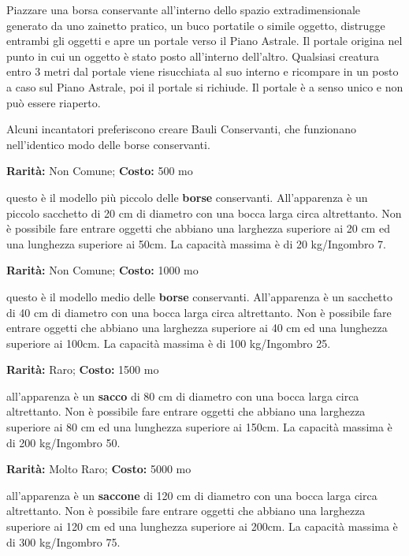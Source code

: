 \begin{multicols}{2}
Piazzare una borsa conservante all'interno dello spazio extradimensionale generato da uno zainetto pratico, un buco portatile o simile oggetto, distrugge entrambi gli oggetti e apre un portale verso il Piano Astrale. Il portale origina nel punto in cui un oggetto è stato posto all'interno dell'altro. Qualsiasi creatura entro 3 metri dal portale viene risucchiata al suo interno e ricompare in un posto a caso sul Piano Astrale, poi il portale si richiude. Il portale è a senso unico e non può essere riaperto.

Alcuni incantatori preferiscono creare Bauli Conservanti, che funzionano nell'identico modo delle borse conservanti.


\textbf{Rarità:} Non Comune; \textbf{Costo:} 500 mo

questo è il modello più piccolo delle \textbf{borse} conservanti. All'apparenza è un piccolo sacchetto di 20 cm di diametro con una bocca larga circa altrettanto.
Non è possibile fare entrare oggetti che abbiano una larghezza superiore ai 20 cm ed una lunghezza superiore ai 50cm.
La capacità massima è di 20 kg/Ingombro 7.


\textbf{Rarità:} Non Comune; \textbf{Costo:} 1000 mo

questo è il modello medio delle \textbf{borse} conservanti. All'apparenza è un sacchetto di 40 cm di diametro con una bocca larga circa altrettanto.
Non è possibile fare entrare oggetti che abbiano una larghezza superiore ai 40 cm ed una lunghezza superiore ai 100cm.
La capacità massima è di 100 kg/Ingombro 25.


\textbf{Rarità:} Raro; \textbf{Costo:} 1500 mo

all'apparenza è un \textbf{sacco} di 80 cm di diametro con una bocca larga circa altrettanto.
Non è possibile fare entrare oggetti che abbiano una larghezza superiore ai 80 cm ed una lunghezza superiore ai 150cm. La capacità massima è di 200 kg/Ingombro 50.


\textbf{Rarità:} Molto Raro; \textbf{Costo:} 5000 mo

all'apparenza è un \textbf{saccone} di 120 cm di diametro con una bocca larga circa altrettanto.
Non è possibile fare entrare oggetti che abbiano una larghezza superiore ai 120 cm ed una lunghezza superiore ai 200cm. La capacità massima è di 300 kg/Ingombro 75.


\end{multicols}
